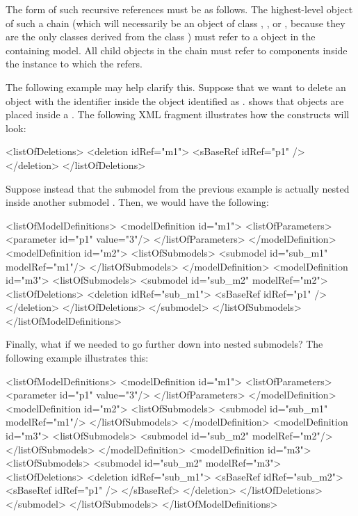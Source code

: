 The form of such recursive references must be as follows.  The
highest-level \SBaseRef object of such a chain (which will necessarily
be an object of class \Port, \Deletion, \ReplacedElement or \ReplacedBy,
because they are the only classes derived from the class \SBaseRef) must
refer to a \Submodel object in the containing model.  All child
\SBaseRef objects in the chain must refer to components inside the
\Model instance to which the \Submodel refers.

The following example may help clarify this.  Suppose that we want to
delete an object with the identifier  inside the \Submodel
object identified as .   shows that \Deletion
objects are placed inside a \ListOfDeletions.  The following XML
fragment illustrates how the constructs will look:

\begin{example}
<listOfDeletions>
  <deletion idRef="m1">
    <sBaseRef idRef="p1" />
  </deletion>
</listOfDeletions>
\end{example}

Suppose instead that the submodel  from the previous example is
actually nested inside another submodel .  Then, we would have
the following:

\begin{example}
<listOfModelDefinitions>
  <modelDefinition id="m1">
    <listOfParameters>
      <parameter id="p1" value="3"/>
    </listOfParameters>
  </modelDefinition>
  <modelDefinition id="m2">
    <listOfSubmodels>
      <submodel id="sub_m1" modelRef="m1"/>
    </listOfSubmodels>    
  </modelDefinition>
  <modelDefinition id="m3">
    <listOfSubmodels>
      <submodel id="sub_m2" modelRef="m2">
        <listOfDeletions>
          <deletion idRef="sub_m1">
            <sBaseRef idRef="p1" />
          </deletion>
        </listOfDeletions>
      </submodel>
    </listOfSubmodels>    
</listOfModelDefinitions>
\end{example}

Finally, what if we needed to go further down into nested submodels?
The following example illustrates this:

\begin{example}
<listOfModelDefinitions> 
  <modelDefinition id="m1"> 
    <listOfParameters> 
      <parameter id="p1" value="3"/> 
    </listOfParameters> 
  </modelDefinition> 
  <modelDefinition id="m2"> 
    <listOfSubmodels> 
      <submodel id="sub_m1" modelRef="m1"/> 
    </listOfSubmodels>     
  </modelDefinition> 
  <modelDefinition id="m3"> 
    <listOfSubmodels> 
      <submodel id="sub_m2" modelRef="m2"/> 
    </listOfSubmodels>     
  </modelDefinition> 
  <modelDefinition id="m3"> 
    <listOfSubmodels> 
      <submodel id="sub_m2" modelRef="m3"> 
        <listOfDeletions> 
          <deletion idRef="sub_m1"> 
            <sBaseRef idRef="sub_m2"> 
              <sBaseRef idRef="p1" />
            </sBaseRef> 
          </deletion> 
        </listOfDeletions> 
      </submodel> 
    </listOfSubmodels>     
</listOfModelDefinitions> 
\end{example}


